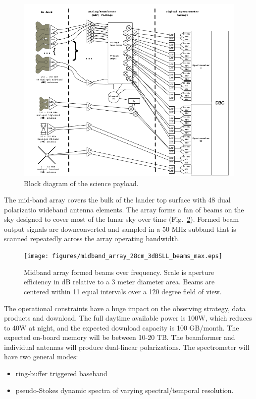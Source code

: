\begin{figure}
	\centering
	\includegraphics[width=\linewidth]{figures/SciencePayload.png}
	\caption{Block diagram of the science payload.\label{fig:block}}
\end{figure}

The mid-band array covers the bulk of the lander top surface with 48 dual polarizatio wideband antenna elements. The array forms a fan of beams on the sky designed to cover most of the lunar sky over time (Fig.\ \ref{fig:midband_beam_maps}). Formed beam output signals are downconverted and sampled in a 50 MHz subband that is scanned repeatedly across the array operating bandwidth. 

\begin{figure}
	\centering
	\texttt{[image: figures/midband\_array\_28cm\_3dBSLL\_beams\_max.eps]}
	\caption{Midband array formed beams over frequency. Scale is aperture efficiency in dB relative to a 3 meter diameter area. Beams are centered within 11 equal intervals over a 120 degree field of view.}
	\label{fig:midband_beam_maps}
\end{figure}


The operational constraints have a huge impact on the observing strategy, data products and download.  The full daytime available power is 100W, which reduces to 40W at night, and the expected download capacity is 100 GB/month.  The expected on-board memory will be between 10-20 TB.  The beamformer and individual antennas will produce dual-linear polarizations.  The spectrometer will have two general modes:
\begin{itemize}[noitemsep]
    \item ring-buffer triggered baseband
    \item pseudo-Stokes dynamic spectra of varying spectral/temporal resolution.
\end{itemize}